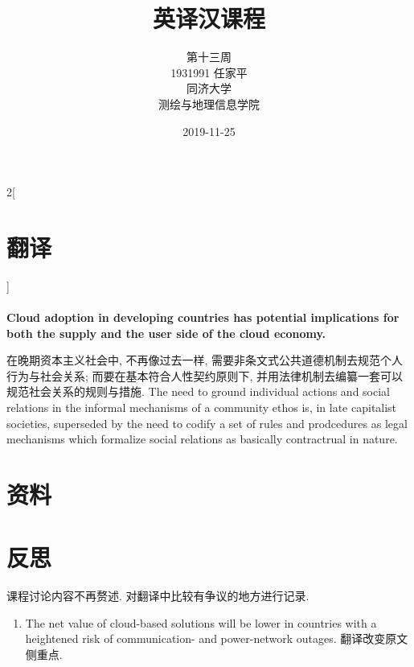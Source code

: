 \documentclass[a4paper, UTF8, 12pt]{article}
\begin{document}
\title{\Huge 英译汉课程}
\author{\Large 
        第十三周 \\[12pt]
        1931991 任家平 \\[12pt]
        同济大学 \\[12pt]
        测绘与地理信息学院}
\date{2019-11-25}

\maketitle

\thispagestyle{empty}

\newpage
{}
\tableofcontents
{}

\newpage
{}

\begin{paracol}{2}[\section{翻译}]

    \switchcolumn*
    \paragraph{} 
    \switchcolumn
    \paragraph{}
    {\bfseries Cloud adoption in developing countries has potential implications for both the supply and the user side of the cloud economy.} 
    
    \switchcolumn*
    在晚期资本主义社会中, 不再像过去一样, 需要非条文式公共道德机制去规范个人行为与社会关系; 而要在基本符合人性契约原则下, 并用法律机制去编纂一套可以规范社会关系的规则与措施.
    \switchcolumn
    The need to ground individual actions and social relations in the informal mechanisms of a community ethos is, in late capitalist societies, superseded by the need to codify a set of rules and prodcedures as legal mechanisms which formalize social relations as basically contractrual in nature.

    

\end{paracol}

\section{资料}


\section{反思}

课程讨论内容不再赘述. 对翻译中比较有争议的地方进行记录.

\begin{enumerate}
    \item The net value of cloud-based solutions will be lower in countries with a heightened risk of communication- and power-network outages. 翻译改变原文侧重点. 
    

\end{enumerate}
\end{document}
